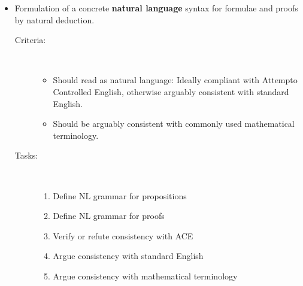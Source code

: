 \documentclass[a4paper]{article}
\begin{document}
\begin{itemize}
\item 
    Formulation of a concrete {\bf natural language} syntax for formulae and
    proofs by natural deduction.
    \begin{description}
        \item[Criteria:]~ \\ \vspace{-5 mm}
            \begin{itemize}
                \item Should read as natural language: Ideally compliant
                with Attempto Controlled English, otherwise arguably
                consistent with standard English.
                \item Should be arguably consistent with commonly used 
                mathematical terminology.
            \end{itemize}
        \item[Tasks:]~ \\ \vspace{-5 mm}
            \begin{enumerate}[\HollowBox]
               \item Define NL grammar for propositions
               \item Define NL grammar for proofs
               \item Verify or refute consistency with ACE
               \item Argue consistency with standard English
               \item Argue consistency with mathematical terminology
            \end{enumerate}
    \end{description}


\end{itemize}
\end{document}

